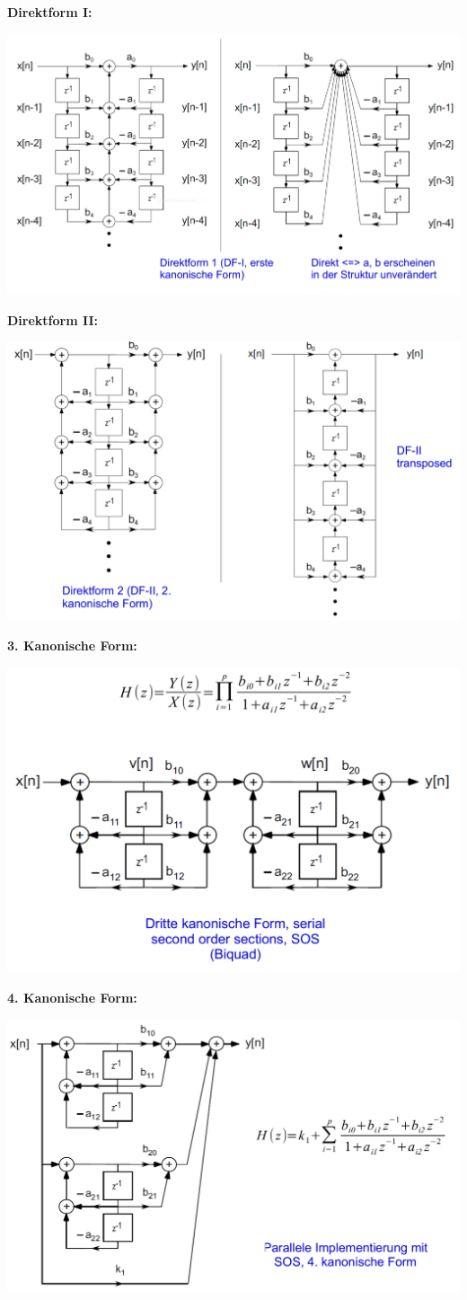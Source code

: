 \documentclass[10pt,a4paper]{article}
\begin{document}
\textbf{Direktform I:}
\begin{center}    
  \includegraphics[width=.5\textwidth]{./img/Direktform_1_IIR.png}  
\end{center}  

\textbf{Direktform II:}
\begin{center}
  \includegraphics[width=.5\textwidth]{./img/Direktform_2_IIR.png}
\end{center}

\textbf{3. Kanonische Form:}
\begin{center}
  \includegraphics[width=.5\textwidth]{./img/Kanonische_Form_3_IIR.png}
\end{center}

\textbf{4. Kanonische Form:}
\begin{center}
  \includegraphics[width=.5\textwidth]{./img/Kanonische_Form_4_IIR.png}
\end{center}
\end{document}
